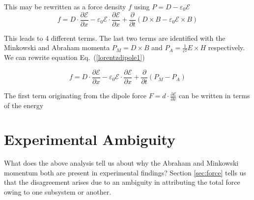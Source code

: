 \documentclass[twocolumn,english,pra,aps,superscriptaddress,floatfix]{revtex4-1}
\begin{document}
This may be rewritten as a force density $f$ using $P=D- \varepsilon_{0}\mathcal{E}$
\begin{equation}
f=D\cdot\frac{\partial\mathcal{E}}{\partial x}- \varepsilon_{0}\mathcal{E}\cdot\frac{\partial\mathcal{E}}{\partial x} + \frac{\partial}{\partial t}\left(D\times B- \varepsilon_{0}\mathcal{E} \times B \right)
\label{lorentzdipole1}
\end{equation}

This leads to 4 different terms.  The last two terms are identified with the Minkowski and Abraham momenta $P_M=D\times B$ and $P_A=\frac{1}{c^2}E\times H$
respectively.  We can rewrite equation Eq.\ (\ref{lorentzdipole1})

\begin{equation}
f=D\cdot\frac{\partial\mathcal{E}}{\partial x}- \varepsilon_{0}\mathcal{E}\cdot\frac{\partial\mathcal{E}}{\partial x} + \frac{\partial}{\partial t}\left(P_M - P_A\right)
\label{lorentzdipole2}
\end{equation}


The first term originating from the dipole force $F = d \cdot \frac{\partial \mathcal{E}}{\partial x}$ can be written in terms of the energy

\section{Experimental Ambiguity}
\label{sec:experiment}


What does the above analysis tell us about why the Abraham and Minkowski momentum both are present in experimental findings?  Section \ref{sec:force} tells us that the disagreement arises due to an ambiguity in attributing the total force owing to one subsystem or another.  

  

\end{document}
